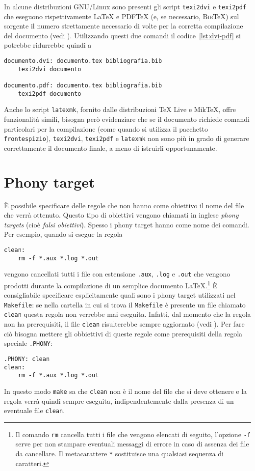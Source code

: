 In alcune distribuzioni GNU/Linux sono presenti gli script \texttt{texi2dvi} e
\texttt{texi2pdf} che eseguono rispettivamente \LaTeX{}
e \textsc{PDF}\TeX{}
(e, se necessario, \textsc{Bib}\TeX) sul sorgente il numero strettamente
necessario di volte per la corretta compilazione del documento (vedi
\textcite[63]{caucci:tabelle}).  Utilizzando questi due comandi il
codice~\ref{lst:dvi-pdf} si potrebbe ridurrebbe quindi a
\begin{lstlisting}
documento.dvi: documento.tex bibliografia.bib
	texi2dvi documento

documento.pdf: documento.tex bibliografia.bib
	texi2pdf documento
\end{lstlisting}
Anche lo script \texttt{latexmk}, fornito dalle distribuzioni TeX Live e MikTeX,
offre funzionalità simili, bisogna però evidenziare che se il documento richiede
comandi particolari per la compilazione (come quando si utilizza il pacchetto
\verb|frontespizio|), \verb|texi2dvi|, \verb|texi2pdf| e \verb|latexmk| non sono
più in grado di generare correttamente il documento finale, a meno di istruirli
opportunamente.

\section{Phony target}
\label{sec:phony}

È possibile specificare delle regole che non hanno come obiettivo il nome del
file che verrà ottenuto.  Questo tipo di obiettivi vengono chiamati in inglese
\emph{phony targets} (cioè \emph{falsi obiettivi}).  Spesso i phony target hanno
come nome dei comandi. Per esempio, quando si esegue la regola
\begin{lstlisting}
clean:
	rm -f *.aux *.log *.out
\end{lstlisting}
vengono cancellati tutti i file con estensione \verb|.aux|, \verb|.log| e
\verb|.out| che vengono prodotti durante la compilazione di un semplice
documento
\LaTeX.\footnote{Il comando \texttt{rm} cancella tutti i file che vengono
  elencati di seguito, l'opzione \texttt{-f} serve per non stampare eventuali
  messaggi di errore in caso di assenza dei file da cancellare.  Il
  metacarattere \texttt{*} sostituisce una qualsiasi sequenza di caratteri.}
È consigliabile specificare esplicitamente quali sono i phony target utilizzati
nel \verb|Makefile|: se nella cartella in cui si trova il \verb|Makefile| è
presente un file chiamato \verb|clean| questa regola non verrebbe mai eseguita.
Infatti, dal momento che la regola non ha prerequisiti, il file \texttt{clean}
risulterebbe sempre aggiornato (vedi \textcite[31]{gnu:make}).  Per fare ciò
bisogna mettere gli obbiettivi di queste regole come prerequisiti della regola
speciale \verb|.PHONY|:
\begin{lstlisting}
.PHONY: clean
clean:
	rm -f *.aux *.log *.out
\end{lstlisting}
In questo modo \verb|make| sa che \verb|clean| non è il nome del file che si
deve ottenere e la regola verrà quindi sempre eseguita, indipendentemente dalla
presenza di un eventuale file \verb|clean|.

